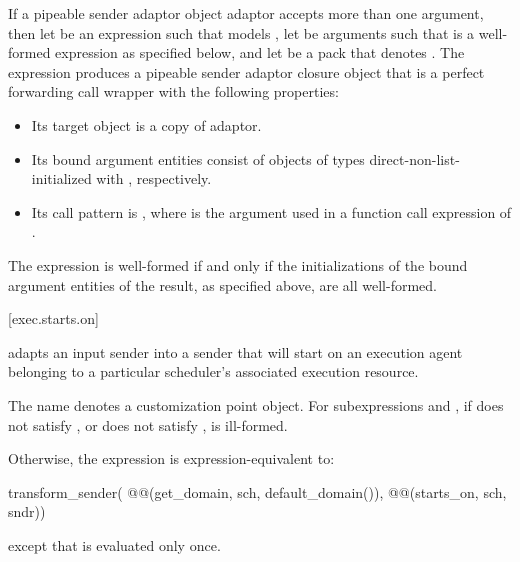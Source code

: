 \pnum
If a pipeable sender adaptor object adaptor accepts more than one argument,
then let  be an expression
such that  models ,
let  be arguments
such that  is a well-formed expression
as specified below, and
let  be a pack that denotes .
The expression  produces
a pipeable sender adaptor closure object 
that is a perfect forwarding call wrapper with the following properties:
\begin{itemize}
\item
Its target object is a copy of adaptor.
\item
Its bound argument entities  consist of
objects of types  direct-non-list-initialized with
, respectively.
\item
Its call pattern is ,
where  is
the argument used in a function call expression of .
\end{itemize}
The expression  is well-formed if and only if
the initializations of the bound argument entities of the result,
as specified above, are all well-formed.

[exec.starts.on]{}

\pnum
{} adapts an input sender into a sender
that will start on an execution agent belonging to
a particular scheduler's associated execution resource.

\pnum
The name  denotes a customization point object.
For subexpressions  and ,
if  does not satisfy , or
 does not satisfy ,
 is ill-formed.

\pnum
Otherwise,
the expression  is expression-equivalent to:
\begin{codeblock}
transform_sender(
  @@(get_domain, sch, default_domain()),
  @@(starts_on, sch, sndr))
\end{codeblock}
except that  is evaluated only once.


